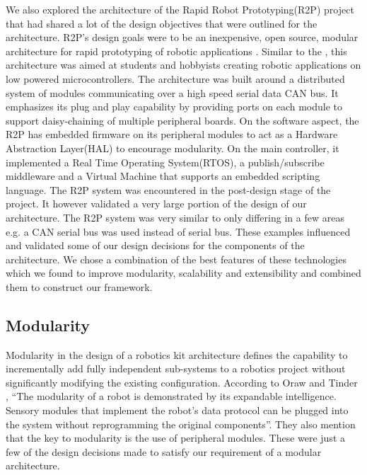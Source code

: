 We also explored the architecture of the Rapid Robot Prototyping(R2P) project that had shared a lot of the design objectives that were outlined for the \xten architecture. R2P's design goals were to be an inexpensive, open source, modular architecture for rapid prototyping of robotic applications \cite{r2p}. Similar to the \xten, this architecture was aimed at students and hobbyists creating robotic applications on low powered microcontrollers. The architecture was built around a distributed system of modules communicating over a high speed serial data CAN bus. It emphasizes its plug and play capability by providing ports on each module to support daisy-chaining of multiple peripheral boards. On the software aspect, the R2P has embedded firmware on its peripheral modules to act as a Hardware Abstraction Layer(HAL) to encourage modularity. On the main controller, it implemented a Real Time Operating System(RTOS), a publish/subscribe middleware and a Virtual Machine that supports an embedded scripting language. The R2P system was encountered in the post-design stage of the \xten project. It however validated a very large portion of the design of our architecture. The R2P system was very similar to \xten only differing in a few areas e.g. a CAN serial bus was used instead of \iic serial bus. 
%
%
These examples influenced and validated some of our design decisions for the components of the \xten architecture. We chose a combination of the best features of these technologies which we found to improve modularity, scalability and extensibility and combined them to construct our framework. 






\subsection{Modularity} %
\label{sub:modularity}
Modularity in the design of a robotics kit architecture defines the capability to incrementally add fully independent sub-systems to a robotics project without significantly modifying the existing configuration. According to Oraw and Tinder \cite{mars}, ``The modularity of a robot is demonstrated by its expandable intelligence. Sensory modules that implement the robot's data protocol can be plugged into the system without reprogramming the original components''. They also mention that the key to modularity is the use of peripheral modules. These were just a few of the design decisions made to satisfy our requirement of a modular architecture. 

